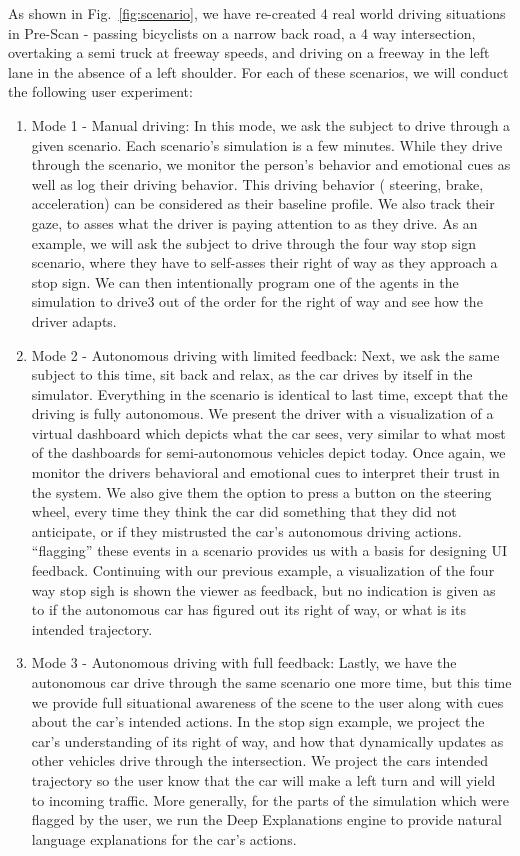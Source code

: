 As shown in Fig.~\ref{fig:scenario}, we have re-created 4 real world driving situations in Pre-Scan - passing bicyclists on a narrow back road, a 4 way intersection, overtaking a semi truck at freeway speeds, and driving on a  freeway in the left lane in the absence of a left shoulder. 
For each of these scenarios, we will conduct the following user experiment:
\begin{enumerate}[itemsep=0pt,parsep=0pt,topsep=4pt,leftmargin=0.4in]
    \item Mode 1 - Manual driving: In this mode, we ask the subject to drive through a given scenario. Each scenario's simulation is a few minutes. While they drive through the scenario, we monitor the person's behavior and emotional cues as well as log their driving behavior. This driving behavior ( steering, brake, acceleration) can be considered as their baseline profile. We also track their gaze, to asses what the driver is paying attention to as they drive. As an example, we will ask the subject to drive through the four way stop sign scenario, where they have to self-asses their right of way as they approach a stop sign. We can then intentionally program one of the agents in the simulation to drive3 out of the order for the right of way and see how the driver adapts. 
    \item Mode 2 - Autonomous driving with limited feedback: Next, we ask the same subject to this time, sit back and relax, as the car drives by itself in the simulator. Everything in the scenario is identical to last time, except that the driving is fully autonomous. We present the driver with a visualization of a virtual dashboard which depicts what the car sees, very similar to what most of the dashboards for semi-autonomous vehicles depict today.  Once again, we monitor the drivers behavioral and emotional cues to interpret their trust in the system. We also give them the option to press a button on the steering wheel, every time they think the car did something that they did not anticipate, or if they mistrusted the car's autonomous driving actions. ``flagging'' these events in a scenario provides us with a basis for designing UI feedback. Continuing with our previous example, a visualization of the four way stop sigh is shown the viewer as feedback, but no indication is given as to if the autonomous car has figured out its right of way, or what is its intended trajectory.
    \item Mode 3 - Autonomous driving with full feedback: Lastly, we have the autonomous car drive through the same scenario one more time, but this time we provide full situational awareness of the scene to the user along with cues about the car's intended actions. In the stop sign example, we project the car's understanding of its right of way, and how that dynamically updates as other vehicles drive through the intersection. We project the cars intended trajectory so the user know that the car will make a left turn and will yield to incoming traffic. More generally, for the parts of the simulation which were flagged by the user, we run the Deep Explanations engine to provide natural language explanations for the car's actions. 
    
\end{enumerate}

